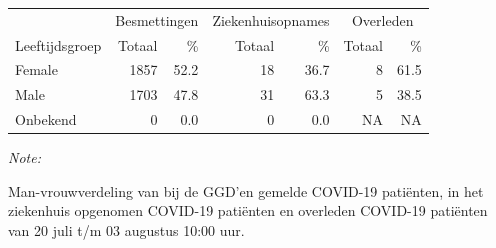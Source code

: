 \documentclass[
  english,
  man,floatsintext]{apa6}
\begin{document}
\begin{table}[H]
\centering\begingroup\fontsize{11}{13}\selectfont

\begin{threeparttable}
\begin{tabular}{lrrrrrr}
\toprule
\multicolumn{1}{c}{ } & \multicolumn{2}{c}{Besmettingen} & \multicolumn{2}{c}{Ziekenhuisopnames} & \multicolumn{2}{c}{Overleden} \\
\cmidrule(l{3pt}r{3pt}){2-3} \cmidrule(l{3pt}r{3pt}){4-5} \cmidrule(l{3pt}r{3pt}){6-7}
Leeftijdsgroep & Totaal & \% & Totaal & \% & Totaal & \%\\
\midrule
Female & 1857 & 52.2 & 18 & 36.7 & 8 & 61.5\\
Male & 1703 & 47.8 & 31 & 63.3 & 5 & 38.5\\
Onbekend & 0 & 0.0 & 0 & 0.0 & NA & NA\\
\bottomrule
\end{tabular}
\begin{tablenotes}
\item \textit{Note: } 
\item Man-vrouwverdeling van bij de GGD’en gemelde COVID-19 patiënten, in het ziekenhuis opgenomen COVID-19 patiënten en overleden COVID-19 patiënten van 20 juli t/m 03 augustus 10:00 uur.
\end{tablenotes}
\end{threeparttable}
\endgroup{}
\end{table}
\newpage
\end{document}

